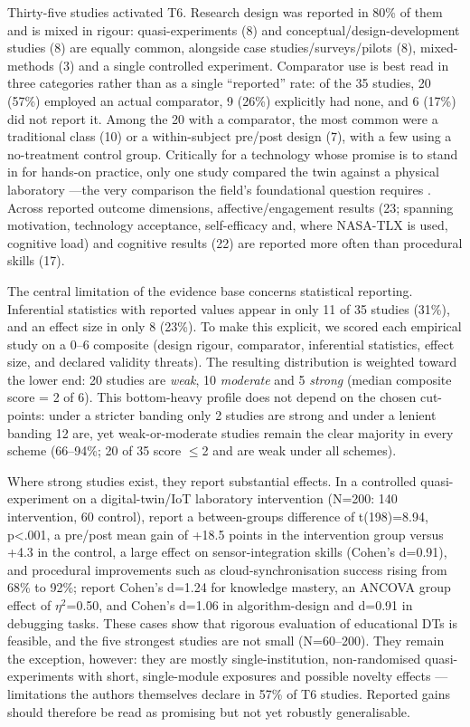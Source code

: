 Thirty-five studies activated T6. Research design was reported in 80\% of them
and is mixed in rigour: quasi-experiments (8) and conceptual/design-development
studies (8) are equally common, alongside case studies/surveys/pilots (8),
mixed-methods (3) and a single controlled experiment. Comparator use is best read
in three categories rather than as a single ``reported'' rate: of the 35 studies,
20 (57\%) employed an actual comparator, 9 (26\%) explicitly had none, and 6 (17\%)
did not report it. Among the 20 with a comparator, the most common were a
traditional class (10) or a within-subject pre/post design (7), with a few using
a no-treatment control group. Critically for a technology whose promise is to
stand in for hands-on practice, only one study compared the twin against a
physical laboratory \cite{liljaniemi_enhancing_2025}---the very comparison the field's
foundational question requires \cite{ma_handson_2006,brinson_learning_2015}. Across
reported outcome dimensions, affective/engagement results
(23; spanning motivation, technology acceptance, self-efficacy and, where
NASA-TLX is used, cognitive load) and cognitive results (22) are reported more often than procedural skills
(17).

The central limitation of the evidence base concerns statistical reporting.
Inferential statistics with reported values appear in only 11 of 35 studies
(31\%), and an effect size in only 8 (23\%). To make this explicit, we scored
each empirical study on a 0--6 composite (design rigour, comparator, inferential
statistics, effect size, and declared validity threats). The resulting distribution is weighted toward
the lower end: 20 studies are \emph{weak}, 10 \emph{moderate} and 5 \emph{strong} (median
composite score = 2 of 6). This bottom-heavy profile does not depend on the
chosen cut-points: under a stricter banding only 2 studies are strong and under a
lenient banding 12 are, yet weak-or-moderate studies remain the clear majority
in every scheme (66--94\%; 20 of 35 score \ensuremath{\leq}2 and are weak under all schemes).

Where strong studies exist, they report substantial effects. In a controlled
quasi-experiment on a digital-twin/IoT laboratory intervention (N=200: 140
intervention, 60 control), \cite{kwateng_enhancing_2026} report a between-groups difference of t(198)=8.94, p\textless.001, a
pre/post mean gain of +18.5 points in the intervention group versus +4.3 in the
control, a large effect on sensor-integration skills (Cohen's d=0.91), and
procedural improvements such as cloud-synchronisation success
rising from 68\% to 92\%; \cite{wang_innovative_2025} report Cohen's d=1.24 for knowledge
mastery, \cite{tarng_application_2024} an ANCOVA group effect of \ensuremath{\eta^{2}}=0.50, and \cite{lu_digital_2025} Cohen's d=1.06 in algorithm-design and d=0.91 in debugging tasks. These cases show
that rigorous evaluation of educational DTs is feasible, and the five strongest
studies are not small (N=60--200). They remain the exception, however: they are
mostly single-institution, non-randomised quasi-experiments with short, single-module
exposures and possible novelty effects --- limitations the authors themselves
declare in 57\% of T6 studies. Reported gains should therefore be read as
promising but not yet robustly generalisable.

